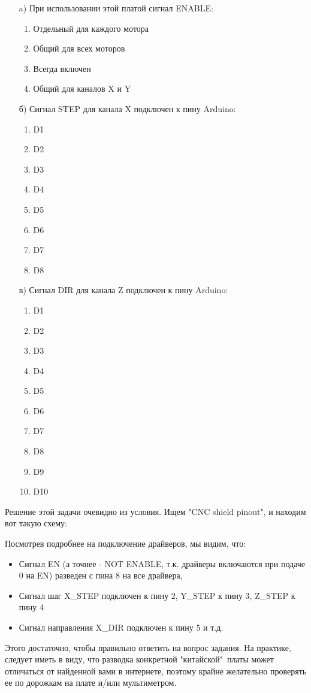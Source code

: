 \begin{enumerate}
    \item[a)] При использовании этой платой сигнал ENABLE: 
    \begin{enumerate}
        \item Отдельный для каждого мотора
        \item Общий для всех моторов
        \item Всегда включен
        \item Общий для каналов X и Y
    \end{enumerate}
    \item[б)] Сигнал STEP для канала X подключен к пину Arduino: 
    \begin{enumerate}
        \item D1
        \item D2
        \item D3
        \item D4
        \item D5
        \item D6
        \item D7
        \item D8
    \end{enumerate}
    \item[в)] Сигнал DIR для канала Z подключен к пину Arduino: 
    \begin{enumerate}
        \item D1
        \item D2
        \item D3
        \item D4
        \item D5
        \item D6
        \item D7
        \item D8
        \item D9
        \item D10
    \end{enumerate}
\end{enumerate}

\solutionSection

Решение этой задачи очевидно из условия. Ищем "CNC shield pinout"{}, и находим вот такую схему:


Посмотрев подробнее на подключение драйверов, мы видим, что:
\begin{itemize}
    \item Сигнал EN (а точнее - NOT ENABLE, т.к. драйверы включаются при подаче 0 на EN) разведен с пина 8 на все драйвера,
    \item Сигнал шаг X\_STEP подключен к пину 2, Y\_STEP к пину 3,  Z\_STEP к пину 4
    \item Сигнал направления X\_DIR подключен к пину 5 и т.д.
\end{itemize}


Этого достаточно, чтобы правильно ответить на вопрос задания.  На практике, следует иметь в виду, что разводка конкретной "китайской"\ платы может отличаться от найденной вами в интернете, поэтому крайне желательно проверять ее по дорожкам на плате и/или мультиметром.